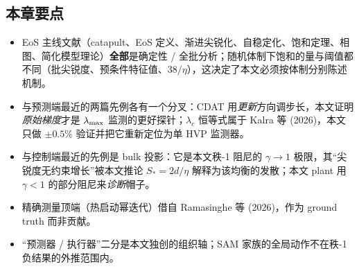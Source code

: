 \subsection*{本章要点}
\begin{itemize}
  \item EoS 主线文献（catapult、EoS
定义、渐进尖锐化、自稳定化、饱和定理、相图、简化模型理论）\textbf{全部}是确定性 /
全批分析；随机体制下饱和的量与阈值都不同（批尖锐度、预条件特征值、$38/\eta$），这决定了本文必须按体制分别陈述机制。
  \item 与预测端最近的两篇先例各有一个分叉：CDAT
用\emph{更新}方向调步长，本文证明\emph{原始梯度}才是 $\lambda_{\max}$
监测的更好探针；$\lambda_c$ 恒等式属于 Kalra 等 (2026)，本文只做 $\pm0.5\%$
验证并把它重新定位为单 HVP 监测器。
  \item 与控制端最近的先例是 bulk 投影：它是本文秩-1 阻尼的 $\gamma\to1$
极限，其“尖锐度无约束增长”被本文推论 $S_{*}=2d/\eta$ 解释为该均衡的发散；本文 plant
用 $\gamma<1$ 的部分阻尼来\emph{诊断}帽子。
  \item 精确测量顶端（热启动幂迭代）借自 Ramasinghe 等 (2026)，作为 ground truth
而非贡献。
  \item “预测器 / 执行器”二分是本文独创的组织轴；SAM 家族的全局动作不在秩-1
负结果的外推范围内。
\end{itemize}
